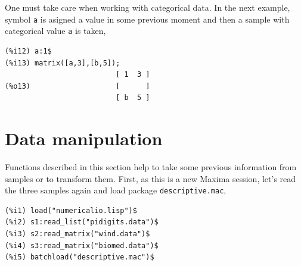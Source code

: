 \documentclass[12pt,a4paper]{article}
\begin{document}
One must take care when working with categorical data. In the next example, symbol \verb|a| is asigned a value in some previous moment and then a sample with categorical value \verb|a| is taken,
\begin{verbatim}
(%i12) a:1$
(%i13) matrix([a,3],[b,5]);
                          [ 1  3 ]
(%o13)                    [      ]
                          [ b  5 ]
\end{verbatim}


\section{Data manipulation}


Functions described in this section help to take some previous information from samples or to transform them. First, as this is a new Maxima session, let's read the three samples again and load package \verb|descriptive.mac|,
\begin{verbatim}
(%i1) load("numericalio.lisp")$
(%i2) s1:read_list("pidigits.data")$
(%i3) s2:read_matrix("wind.data")$
(%i4) s3:read_matrix("biomed.data")$
(%i5) batchload("descriptive.mac")$
\end{verbatim}
\end{document}
